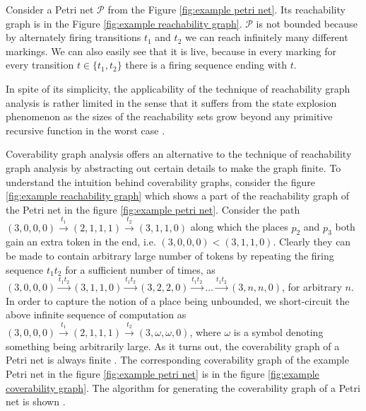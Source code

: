 \begin{example}
  Consider a Petri net $\mathcal P$ from the Figure \ref{fig:example petri net}. Its reachability graph is in the Figure \ref{fig:example reachability graph}. $\mathcal P$ is not bounded because by alternately firing transitions $t_1$ and $t_2$ we can reach infinitely many different markings. We can also easily see that it is live, because in every marking for every transition $t\in\{t_1, t_2\}$ there is a firing sequence ending with $t$.
\end{example}

In spite of its simplicity, the applicability of the technique of reachability graph analysis is rather limited in the sense that it suffers from the state explosion phenomenon as the sizes of the reachability sets grow beyond any primitive recursive function in the worst case \cite{Yen06PetriNets}.

 Coverability graph analysis offers an alternative to the technique of reachability graph analysis by abstracting out certain details to make the graph finite. To understand the intuition behind coverability graphs, consider the figure \ref{fig:example reachability graph} which shows a part of the reachability graph of the Petri net in the figure \ref{fig:example petri net}. Consider the path $(3,0,0,0)\xrightarrow{t_1}(2,1,1,1)\xrightarrow{t_2}(3,1,1,0)$ along which the places $p_2$ and $p_3$ both gain an extra token in the end, i.e. $(3,0,0,0) < (3,1,1,0)$. Clearly they can be made to contain arbitrary large number of tokens by repeating the firing sequence $t_1t_2$ for a sufficient number of times, as $(3,0,0,0)\xrightarrow{t_1t_2}(3,1,1,0)\xrightarrow{t_1t_2}(3,2,2,0)\xrightarrow{t_1t_2}\ldots\xrightarrow{t_1t_2}(3,n,n,0)$, for arbitrary $n$. In order to capture the notion of a place being unbounded, we short-circuit the above infinite sequence of computation as $(3,0,0,0)\xrightarrow{t_1}(2,1,1,1)\xrightarrow{t_2}(3,\omega,\omega,0)$, where $\omega$ is a symbol denoting something being arbitrarily large. As it turns out, the coverability graph of a Petri net is always finite \cite{Karp69ParallelProgramSchemata, Hack:1976:DQP:889753}. The corresponding coverability graph of the example Petri net in the figure \ref{fig:example petri net} is in the figure \ref{fig:example coverability graph}. The algorithm for generating the coverability graph of a Petri net \cite{Yen06PetriNets} is shown .

